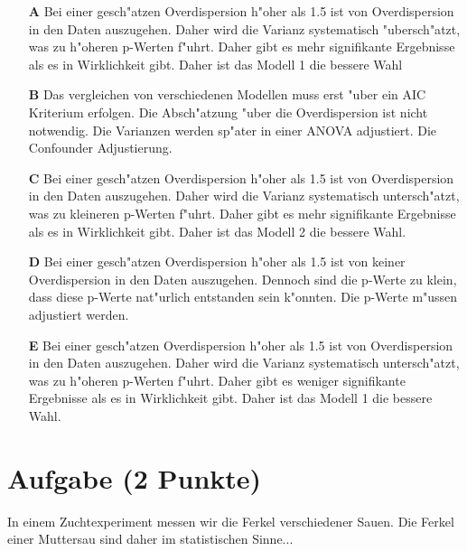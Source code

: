 \documentclass[a4paper, 10pt]{scrartcl}\usepackage[]{graphicx}\usepackage[]{xcolor}
\begin{document}
\begin{enumerate}
\item [\textbf{A} \msquare] Bei einer gesch{"a}tzen Overdispersion h{"o}her als 1.5 ist von Overdispersion in den Daten auszugehen. Daher wird die Varianz systematisch {"u}bersch{"a}tzt, was zu h{"o}heren p-Werten f{"u}hrt. Daher gibt es mehr signifikante Ergebnisse als es in Wirklichkeit gibt. Daher ist das Modell 1 die bessere Wahl
\item [\textbf{B} \msquare] Das vergleichen von verschiedenen Modellen muss erst {"u}ber ein AIC Kriterium erfolgen. Die Absch{"a}tzung {"u}ber die Overdispersion ist nicht notwendig. Die Varianzen werden sp{"a}ter in einer ANOVA adjustiert. Die Confounder Adjustierung.
\item [\textbf{C} \msquare] Bei einer gesch{"a}tzen Overdispersion h{"o}her als 1.5 ist von Overdispersion in den Daten auszugehen. Daher wird die Varianz systematisch untersch{"a}tzt, was zu kleineren p-Werten f{"u}hrt. Daher gibt es mehr signifikante Ergebnisse als es in Wirklichkeit gibt. Daher ist das Modell 2 die bessere Wahl.
\item [\textbf{D} \msquare] Bei einer gesch{"a}tzen Overdispersion h{"o}her als 1.5 ist von keiner Overdispersion in den Daten auszugehen. Dennoch sind die p-Werte zu klein, dass diese p-Werte nat{"u}rlich entstanden sein k{"o}nnten. Die p-Werte m{"u}ssen adjustiert werden.
\item [\textbf{E} \msquare] Bei einer gesch{"a}tzen Overdispersion h{"o}her als 1.5 ist von Overdispersion in den Daten auszugehen. Daher wird die Varianz systematisch untersch{"a}tzt, was zu h{"o}heren p-Werten f{"u}hrt. Daher gibt es weniger signifikante Ergebnisse als es in Wirklichkeit gibt. Daher ist das Modell 1 die bessere Wahl.
\end{enumerate}

\section{Aufgabe \hfill (2 Punkte)}

In einem Zuchtexperiment messen wir die Ferkel verschiedener Sauen. Die
Ferkel einer Muttersau sind daher im statistischen Sinne... 
\end{document}
